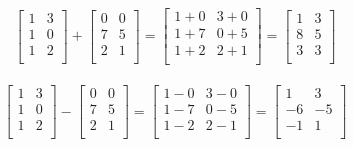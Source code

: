 
\begin{align}\nonumber
	\left[\begin{matrix}
			1 & 3 \\
			1 & 0 \\
			1 & 2 \\
		\end{matrix} \right]
	+
	\left[\begin{matrix}
			0 & 0 \\
			7 & 5 \\
			2 & 1 \\
		\end{matrix} \right]
	=
	\left[\begin{matrix}
			1+0 & 3+0 \\
			1+7 & 0+5 \\
			1+2 & 2+1 \\
		\end{matrix} \right]
	=
	\left[\begin{matrix}
			1 & 3 \\
			8 & 5 \\
			3 & 3 \\
		\end{matrix} \right]
\end{align}

\begin{align}\nonumber
	\left[\begin{matrix}
			1 & 3 \\
			1 & 0 \\
			1 & 2 \\
		\end{matrix} \right]
	-
	\left[\begin{matrix}
			0 & 0 \\
			7 & 5 \\
			2 & 1 \\
		\end{matrix} \right]
	=
	\left[\begin{matrix}
			1-0 & 3-0 \\
			1-7 & 0-5 \\
			1-2 & 2-1 \\
		\end{matrix} \right]
	=
	\left[\begin{matrix}
			1  & 3  \\
			-6 & -5 \\
			-1 & 1  \\
		\end{matrix} \right]
\end{align}

